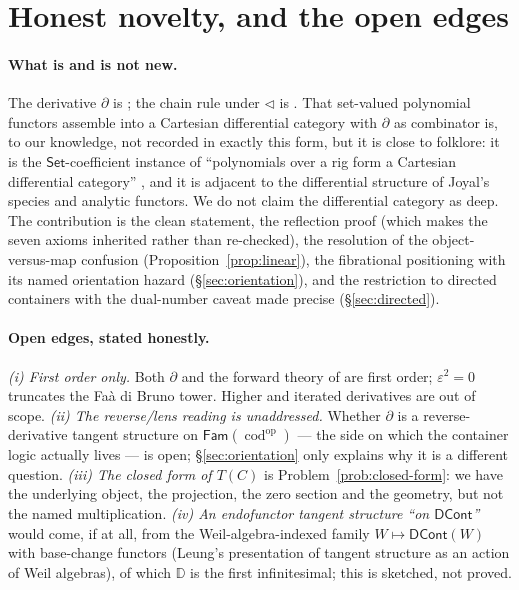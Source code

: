 \documentclass[11pt]{article}
\theoremstyle{definition}
\newcommand{\DCont}{\mathsf{DCont}}
\newcommand{\Set}{\mathsf{Set}}
\newcommand{\Fam}{\mathsf{Fam}}
\newcommand{\DD}{\mathbb{D}}
\newcommand{\cod}{\operatorname{cod}}
\begin{document}
\section{Honest novelty, and the open edges}\label{sec:conclusion}

\paragraph{What is and is not new.}
The derivative $\partial$ is \cite{AAGM2003}; the chain rule under $\lhd$ is \cite{MacBethChainRule}.
That set-valued polynomial functors assemble into a Cartesian differential category with $\partial$ as
combinator is, to our knowledge, not recorded in exactly this form, but it is close to folklore: it is
the $\Set$-coefficient instance of ``polynomials over a rig form a Cartesian differential category''
\cite{BCS2009}, and it is adjacent to the differential structure of Joyal's species and analytic
functors. We do not claim the differential category as deep. The contribution is the clean statement,
the reflection proof (which makes the seven axioms inherited rather than re-checked), the resolution of
the object-versus-map confusion (Proposition~\ref{prop:linear}), the fibrational positioning with its
named orientation hazard (\S\ref{sec:orientation}), and the restriction to directed containers with the
dual-number caveat made precise (\S\ref{sec:directed}).

\paragraph{Open edges, stated honestly.}
\emph{(i) First order only.} Both $\partial$ and the forward theory of \cite{CCGZ2024} are first order;
$\varepsilon^2=0$ truncates the Fa\`a di Bruno tower. Higher and iterated derivatives are out of scope.
\emph{(ii) The reverse/lens reading is unaddressed.} Whether $\partial$ is a reverse-derivative tangent
structure on $\Fam(\cod^{\mathrm{op}})$ --- the side on which the container logic actually lives --- is
open; \S\ref{sec:orientation} only explains why it is a different question.
\emph{(iii) The closed form of $T(C)$} is Problem~\ref{prob:closed-form}: we have the underlying object,
the projection, the zero section and the geometry, but not the named multiplication.
\emph{(iv) An endofunctor tangent structure ``on $\DCont$''} would come, if at all, from the
Weil-algebra-indexed family $W\mapsto\DCont(W)$ with base-change functors (Leung's presentation of
tangent structure as an action of Weil algebras), of which $\DD$ is the first infinitesimal; this is
sketched, not proved.
\end{document}
